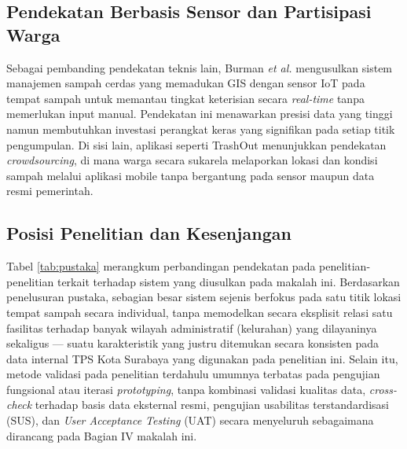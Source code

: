 \documentclass[conference]{IEEEtran}
\begin{document}
\subsection{Pendekatan Berbasis Sensor dan Partisipasi Warga}

Sebagai pembanding pendekatan teknis lain, Burman \textit{et al.}
\cite{burman2022} mengusulkan sistem manajemen sampah cerdas yang
memadukan GIS dengan sensor IoT pada tempat sampah untuk memantau
tingkat keterisian secara \textit{real-time} tanpa memerlukan input
manual. Pendekatan ini menawarkan presisi data yang tinggi namun
membutuhkan investasi perangkat keras yang signifikan pada setiap
titik pengumpulan. Di sisi lain, aplikasi seperti TrashOut
\cite{trashout} menunjukkan pendekatan \textit{crowdsourcing}, di
mana warga secara sukarela melaporkan lokasi dan kondisi sampah
melalui aplikasi mobile tanpa bergantung pada sensor maupun data
resmi pemerintah.

\subsection{Posisi Penelitian dan Kesenjangan}

Tabel \ref{tab:pustaka} merangkum perbandingan pendekatan pada
penelitian-penelitian terkait terhadap sistem yang diusulkan pada
makalah ini. Berdasarkan penelusuran pustaka, sebagian besar sistem
sejenis berfokus pada satu titik lokasi tempat sampah secara individual,
tanpa memodelkan secara eksplisit relasi satu fasilitas terhadap
banyak wilayah administratif (kelurahan) yang dilayaninya sekaligus
--- suatu karakteristik yang justru ditemukan secara konsisten pada
data internal TPS Kota Surabaya yang digunakan pada penelitian ini.
Selain itu, metode validasi pada penelitian terdahulu umumnya terbatas
pada pengujian fungsional atau iterasi \textit{prototyping}, tanpa
kombinasi validasi kualitas data, \textit{cross-check} terhadap basis
data eksternal resmi, pengujian usabilitas terstandardisasi (SUS), dan
\textit{User Acceptance Testing} (UAT) secara menyeluruh sebagaimana
dirancang pada Bagian IV makalah ini.
\end{document}
